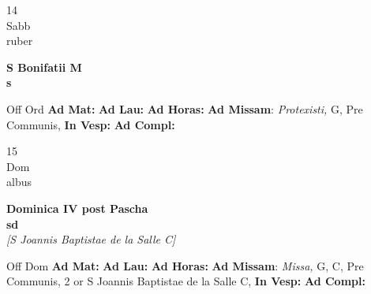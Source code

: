 \documentclass[10pt, openany]{book}
\begin{document}
        \begin{center}
            \begin{minipage}{3.5in}
                \vspace{2em}
                \begin{minipage}{0.5in}
                    {\Huge 14} \\
                    {\normalsize Sabb} \\
                    {\normalsize ruber}
                \end{minipage}
                \begin{minipage}{3.0in}
                    \textbf{ \large S Bonifatii M \\
                    \textnormal{\normalsize s}} \\ 
                \end{minipage}
                \begin{justify}Off Ord
                    \textbf{Ad Mat: }
                    \textbf{Ad Lau: }
                    \textbf{Ad Horas: }\textbf{Ad Missam}: \textit{Protexisti,} G, Pre Communis,  
                    \textbf{In Vesp: }
                    \textbf{Ad Compl: }
                \end{justify}
            \end{minipage}
        \end{center}
    
        \begin{center}
            \begin{minipage}{3.5in}
                \vspace{2em}
                \begin{minipage}{0.5in}
                    {\Huge 15} \\
                    {\normalsize Dom} \\
                    {\normalsize albus}
                \end{minipage}
                \begin{minipage}{3.0in}
                    \textbf{ \large Dominica IV post Pascha \\
                    \textnormal{\normalsize sd}} \\ \textit{[S Joannis Baptistae de la Salle C]} \\ 
                \end{minipage}
                \begin{justify}Off Dom
                    \textbf{Ad Mat: }
                    \textbf{Ad Lau: }
                    \textbf{Ad Horas: }\textbf{Ad Missam}: \textit{Missa,} G, C, Pre Communis, 2 or S Joannis Baptistae de la Salle C,  
                    \textbf{In Vesp: }
                    \textbf{Ad Compl: }
                \end{justify}
            \end{minipage}
        \end{center}
    
\end{document}
